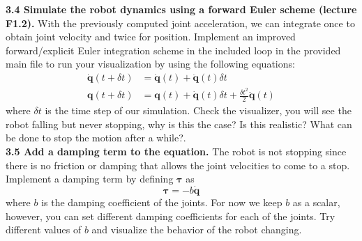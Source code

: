 \documentclass[11pt]{article}
\begin{document}
\textbf{3.4 Simulate the robot dynamics using a forward Euler scheme (lecture F1.2).} 
With the previously computed joint acceleration, we can integrate once to obtain joint velocity and twice for position. 
Implement an improved forward/explicit Euler integration scheme in the included  loop in the provided main file to run your visualization  by using the following equations:
\begin{align*}
	\dot{\mathbf{q}}(t  + \delta t) &= \dot{\mathbf{q}} (t) + \ddot{\mathbf{q}}(t) \delta t \\
	\mathbf{q}(t +\delta t) &= \mathbf{q}(t) + \dot{\mathbf{q}} (t) \delta t + \frac{\delta t^2}{2}\ddot{\mathbf{q}}(t)
\end{align*}
 where $\delta t$ is the time step of our simulation. Check the visualizer, you will see the robot falling 
 but never stopping, why is this the case? Is this realistic? What can be done to stop the motion after a while?. \\ 
 
\textbf{3.5 Add a damping term to the equation.} 
The robot is not stopping since there is no friction or damping that allows the joint velocities to come to a stop. 
Implement a damping term by defining $\mathbf{\tau}$ as
\begin{equation*}
	\boldsymbol{\tau} = -b\dot{\mathbf{q}}
\end{equation*} 
where $b$ is the damping coefficient of the joints. For now we keep $b$ as a scalar, however, you can set different damping coefficients for each of the joints. Try different values of $b$ and visualize the behavior of the robot changing.\\
\end{document}
